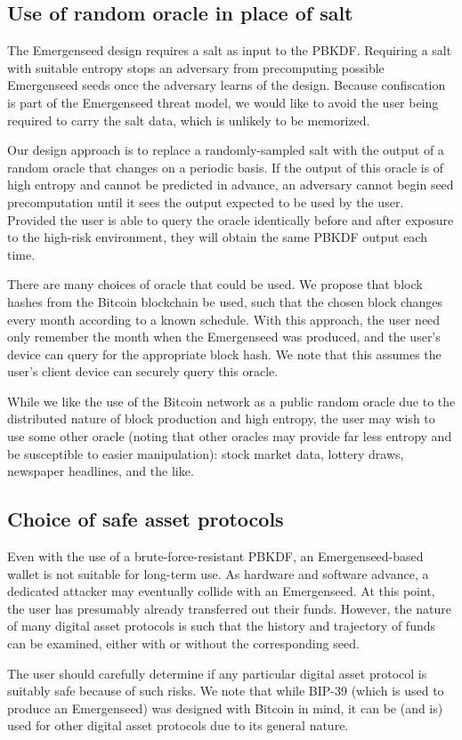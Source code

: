 \documentclass{article}
\begin{document}
\subsection{Use of random oracle in place of salt}

The Emergenseed design requires a salt as input to the PBKDF.
Requiring a salt with suitable entropy stops an adversary from precomputing possible Emergenseed seeds once the adversary learns of the design.
Because confiscation is part of the Emergenseed threat model, we would like to avoid the user being required to carry the salt data, which is unlikely to be memorized.

Our design approach is to replace a randomly-sampled salt with the output of a random oracle that changes on a periodic basis.
If the output of this oracle is of high entropy and cannot be predicted in advance, an adversary cannot begin seed precomputation until it sees the output expected to be used by the user.
Provided the user is able to query the oracle identically before and after exposure to the high-risk environment, they will obtain the same PBKDF output each time.

There are many choices of oracle that could be used.
We propose that block hashes from the Bitcoin blockchain be used, such that the chosen block changes every month according to a known schedule.
With this approach, the user need only remember the month when the Emergenseed was produced, and the user's device can query for the appropriate block hash.
We note that this assumes the user's client device can securely query this oracle.

While we like the use of the Bitcoin network as a public random oracle due to the distributed nature of block production and high entropy, the user may wish to use some other oracle (noting that other oracles may provide far less entropy and be susceptible to easier manipulation): stock market data, lottery draws, newspaper headlines, and the like.


\subsection{Choice of safe asset protocols}

Even with the use of a brute-force-resistant PBKDF, an Emergenseed-based wallet is not suitable for long-term use.
As hardware and software advance, a dedicated attacker may eventually collide with an Emergenseed.
At this point, the user has presumably already transferred out their funds.
However, the nature of many digital asset protocols is such that the history and trajectory of funds can be examined, either with or without the corresponding seed.

The user should carefully determine if any particular digital asset protocol is suitably safe because of such risks.
We note that while BIP-39 (which is used to produce an Emergenseed) was designed with Bitcoin in mind, it can be (and is) used for other digital asset protocols due to its general nature.
\end{document}
